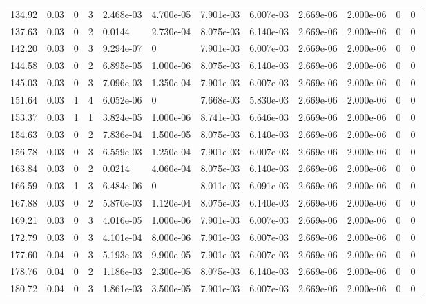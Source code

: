\documentclass[preview]{standalone}
\begin{document}
{{{\begin{tabular}{L{1.2cm}C{1.2cm} C{0.3cm}C{0.5cm} C{1.4cm}C{1.4cm} C{1.4cm}C{1.4cm} C{1.6cm}C{1.6cm} C{1.6cm}C{1.6cm}}
  134.92  &  0.03  & 0     &  3 &  2.468e-03  & 4.700e-05  &  7.901e-03&   6.007e-03& 2.669e-06 & 2.000e-06   &  0 & 0  \\ 
  137.63  &  0.03  & 0     &  2 &  0.0144  & 2.730e-04  &  8.075e-03&   6.140e-03& 2.669e-06 & 2.000e-06   &  0 & 0  \\ 
  142.20  &  0.03  & 0     &  3 &  9.294e-07  & 0  &  7.901e-03&   6.007e-03& 2.669e-06 & 2.000e-06   &  0 & 0  \\ 
  144.58  &  0.03  & 0     &  2 &  6.895e-05  & 1.000e-06  &  8.075e-03&   6.140e-03& 2.669e-06 & 2.000e-06   &  0 & 0  \\ 
  145.03  &  0.03  & 0     &  3 &  7.096e-03  & 1.350e-04  &  7.901e-03&   6.007e-03& 2.669e-06 & 2.000e-06   &  0 & 0  \\ 
  151.64  &  0.03  & 1     &  4 &  6.052e-06  & 0  &  7.668e-03&   5.830e-03& 2.669e-06 & 2.000e-06   &  0 & 0  \\ 
  153.37  &  0.03  & 1     &  1 &  3.824e-05  & 1.000e-06  &  8.741e-03&   6.646e-03& 2.669e-06 & 2.000e-06   &  0 & 0  \\ 
  154.63  &  0.03  & 0     &  2 &  7.836e-04  & 1.500e-05  &  8.075e-03&   6.140e-03& 2.669e-06 & 2.000e-06   &  0 & 0  \\ 
  156.78  &  0.03  & 0     &  3 &  6.559e-03  & 1.250e-04  &  7.901e-03&   6.007e-03& 2.669e-06 & 2.000e-06   &  0 & 0  \\ 
  163.84  &  0.03  & 0     &  2 &  0.0214  & 4.060e-04  &  8.075e-03&   6.140e-03& 2.669e-06 & 2.000e-06   &  0 & 0  \\ 
  166.59  &  0.03  & 1     &  3 &  6.484e-06  & 0  &  8.011e-03&   6.091e-03& 2.669e-06 & 2.000e-06   &  0 & 0  \\ 
  167.88  &  0.03  & 0     &  2 &  5.870e-03  & 1.120e-04  &  8.075e-03&   6.140e-03& 2.669e-06 & 2.000e-06   &  0 & 0  \\ 
  169.21  &  0.03  & 0     &  3 &  4.016e-05  & 1.000e-06  &  7.901e-03&   6.007e-03& 2.669e-06 & 2.000e-06   &  0 & 0  \\ 
  172.79  &  0.03  & 0     &  3 &  4.101e-04  & 8.000e-06  &  7.901e-03&   6.007e-03& 2.669e-06 & 2.000e-06   &  0 & 0  \\ 
  177.60  &  0.04  & 0     &  3 &  5.193e-03  & 9.900e-05  &  7.901e-03&   6.007e-03& 2.669e-06 & 2.000e-06   &  0 & 0  \\ 
  178.76  &  0.04  & 0     &  2 &  1.186e-03  & 2.300e-05  &  8.075e-03&   6.140e-03& 2.669e-06 & 2.000e-06   &  0 & 0  \\ 
  180.72  &  0.04  & 0     &  3 &  1.861e-03  & 3.500e-05  &  7.901e-03&   6.007e-03& 2.669e-06 & 2.000e-06   &  0 & 0  \\ 

\end{tabular}}}}
\end{document}
